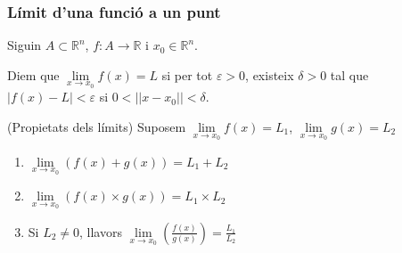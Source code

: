 \documentclass[../main.tex]{subfiles}
\begin{document}
    \subsubsection{Límit d'una funció a un punt}
    Siguin $A \subset \mathbb{R}^n$, $f: A \rightarrow \mathbb{R}$ i $x_0 \in \mathbb{R}^n$.
    \begin{definicio}
        Diem que $\lim\limits_{x\rightarrow x_0} f(x) = L$ si per tot $\varepsilon > 0$, existeix $\delta > 0$
        tal que $|f(x)-L| < \varepsilon$ si $0 < ||x-x_0|| < \delta$.
    \end{definicio}
    \begin{corolari}(Propietats dels límits)
        Suposem $\lim\limits_{x\rightarrow x_0} f(x) = L_1$, $\lim\limits_{x\rightarrow x_0} g(x) = L_2$
        \begin{enumerate}
            \item $\lim\limits_{x\rightarrow x_0} (f(x) + g(x)) = L_1 + L_2$
            \item $\lim\limits_{x\rightarrow x_0} (f(x) \times g(x)) = L_1 \times L_2$
            \item Si $L_2 \neq 0$, llavors $\lim\limits_{x\rightarrow x_0} (\frac{f(x)}{g(x)}) = \frac{L_1}{L_2}$ 
        \end{enumerate}
    \end{corolari}
\end{document}

